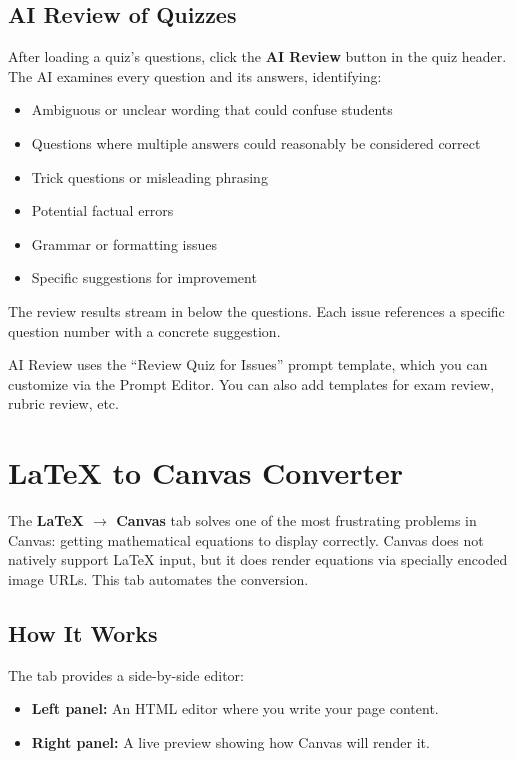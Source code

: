 \documentclass[12pt,letterpaper]{article}
\begin{document}
\subsection{AI Review of Quizzes}

After loading a quiz's questions, click the \textbf{AI Review} button in the quiz header. The AI examines every question and its answers, identifying:

\begin{itemize}[leftmargin=*]
    \item Ambiguous or unclear wording that could confuse students
    \item Questions where multiple answers could reasonably be considered correct
    \item Trick questions or misleading phrasing
    \item Potential factual errors
    \item Grammar or formatting issues
    \item Specific suggestions for improvement
\end{itemize}

The review results stream in below the questions. Each issue references a specific question number with a concrete suggestion.

\begin{notebox}
AI Review uses the ``Review Quiz for Issues'' prompt template, which you can customize via the Prompt Editor. You can also add templates for exam review, rubric review, etc.
\end{notebox}


\section{\LaTeX{} to Canvas Converter}

The \textbf{LaTeX $\to$ Canvas} tab solves one of the most frustrating problems in Canvas: getting mathematical equations to display correctly. Canvas does not natively support \LaTeX{} input, but it does render equations via specially encoded image URLs. This tab automates the conversion.

\subsection{How It Works}

The tab provides a side-by-side editor:
\begin{itemize}[leftmargin=*]
    \item \textbf{Left panel:} An HTML editor where you write your page content.
    \item \textbf{Right panel:} A live preview showing how Canvas will render it.
\end{itemize}
\end{document}
